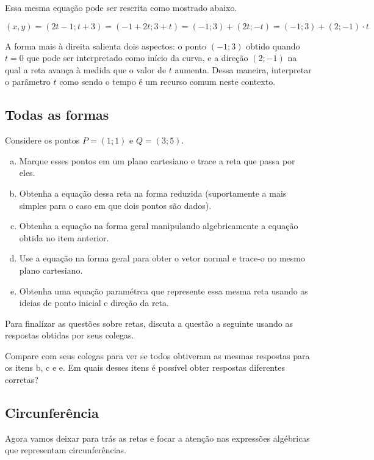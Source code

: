 \documentclass[main_estudante.tex]{subfiles}
\begin{document}
Essa mesma equação pode ser rescrita como mostrado abaixo.

$$(x,y)=(2t-1;t+3)=(-1+2t;3+t)=(-1;3)+(2t;-t)=(-1;3)+(2;-1) \cdot t$$

A forma mais à direita salienta dois aspectos: o ponto $(-1;3)$ obtido quando $t=0$ que pode ser interpretado como início da curva, e a direção $(2;-1)$ na qual a reta avança à medida que o valor de $t$ aumenta. Dessa maneira, interpretar o parâmetro $t$ como sendo o tempo é um recurso comum neste contexto.

\subsection*{Todas as formas}

\begin{questao}
Considere os pontos $P=(1;1)$ e $Q=(3;5)$.
\begin{enumerate}[a)]
\item Marque esses pontos em um plano cartesiano e trace a reta que passa por eles.
\item Obtenha a equação dessa reta na forma reduzida (suportamente a mais simples para o caso em que dois pontos são dados).
\item Obtenha a equação na forma geral manipulando algebricamente a equação obtida no item anterior.
\item Use a equação na forma geral para obter o vetor normal e trace-o no mesmo plano cartesiano.
\item Obtenha uma equação paramétrca que represente essa mesma reta usando as ideias de ponto inicial e direção da reta.
\end{enumerate} 
\end{questao}

Para finalizar as questões sobre retas, discuta a questão a seguinte usando as respostas obtidas por seus colegas.

\begin{reflita}
Compare com seus colegas para ver se todos obtiveram as mesmas respostas para os itens b, c e e. Em quais desses itens é possível obter respostas diferentes corretas? 
\end{reflita}

\subsection*{Circunferência}

Agora vamos deixar para trás as retas e focar a atenção nas expressões algébricas que representam circunferências.
\end{document}
